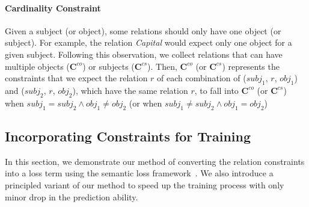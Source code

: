 
\paragraph{Cardinality Constraint}
Given a subject (or object), some relations should only have one object (or subject).
For example, the relation \emph{Capital} would expect only one object for a given subject.
Following this observation, we collect relations that can have multiple objects ($\bm{C}^{co}$) or subjects ($\bm{C}^{cs}$).
Then, $\bm{C}^{co}$ (or $\bm{C}^{cs}$) represents the constraints that we expect the relation $r$ of each combination of ($subj_1$, $r$, $obj_1$) and ($subj_2$, $r$, $obj_2$), which have the same relation $r$, to fall into $\bm{C}^{co}$ (or $\bm{C}^{cs}$) when $subj_1=subj_2 \land obj_1\neq obj_2$ (or when $subj_1\neq subj_2 \land obj_1=obj_2$)




\subsection{Incorporating  Constraints for Training}
\label{sec:loss_term}
In this section, we demonstrate our method of converting the relation constraints into a loss term using the semantic loss framework~\cite{xu2017semantic}.
We also introduce a principled variant of our method to speed up the training process with only minor drop in the prediction ability.


